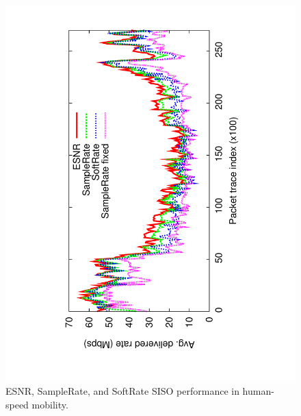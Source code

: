 \begin{figure}[p]
      \centering
      \includegraphics[angle=-90,viewport=120 68 491 760,clip,width=0.95\columnwidth]{figures/siso_rate_time_opt_eff_sr_so.pdf}
      \vspace{-2pt}
      \caption{\label{fig:siso_rate_time_opt_eff_sr_so} ESNR, SampleRate, and SoftRate SISO performance in human-speed mobility.}
      \vspace{-2pt}
\end{figure}

